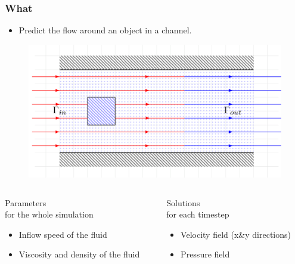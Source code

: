 \documentclass[18pt, xcolor=table]{beamer}
\begin{document}
\begin{frame}[t]
  \frametitle{What}
  \begin{itemize}
  \item Predict the flow around an object in a channel.
  \end{itemize}

  \begin{figure}[htb]
    \includegraphics[scale=0.14]{images/channel/flow_2}
  \end{figure}

  \vspace{-1cm}

  \begin{columns}[t]
    \begin{column}{0.5\textwidth}
      \begin{center}
        \Large{Parameters}\\
        \small{for the whole simulation}
      \end{center}
      \begin{itemize}
      \item Inflow speed of the fluid
      \item Viscosity and density of the fluid
      \end{itemize}

    \end{column}
    \begin{column}{0.5\textwidth}
      \begin{center}
        \Large{Solutions}\\
        \small{for each timestep}
      \end{center}

      \begin{itemize}
      \item Velocity field (x\&y directions)
      \item Pressure field
      \end{itemize}

    \end{column}
  \end{columns}

\end{frame}
\end{document}
